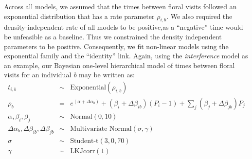 \begin{refsection}
Across all models, we assumed that the times between floral visits followed an exponential distribution that has a rate parameter $\rho_{i,b}$. We also required  the density-independent rate of all models to be positive,as a ``negative'' time would be unfeasible as a baseline. Thus we constrained the density independent parameters to be positive. Consequently, we fit non-linear models using the exponential family and the ``identity'' link. Again, using the \textit{interference} model as an example, our Bayesian one-level hierarchical model of times between floral visits for an individual \textit{b} may be written as:
  \begin{eqnarray}
   t_{i,b} &\sim& {\textrm{Exponential}}(\rho_{i,b}) \\
  \rho_{b} &=& e^{(\alpha + \Delta \alpha_{b})} +  (\beta_{i}+ \Delta\beta_{ib})  (P_{i}-1) +    \sum_{j} (\beta_{j}+ \Delta\beta_{jb})P_{j} \\
{\alpha,\beta_{i},\beta_{j}} &\sim& {\textrm{Normal}}(0,10) \\
{\Delta\alpha_{b}, \Delta\beta_{ib},\Delta\beta_{jb}}  &\sim&{\textrm{Multivariate Normal}} (\sigma,\gamma) \\
\sigma &\sim& {\text{Student-t}} (3,0,70)\\
\gamma &\sim& {\textrm{LKJcorr}}(1)
  \end{eqnarray}



\end{refsection}

